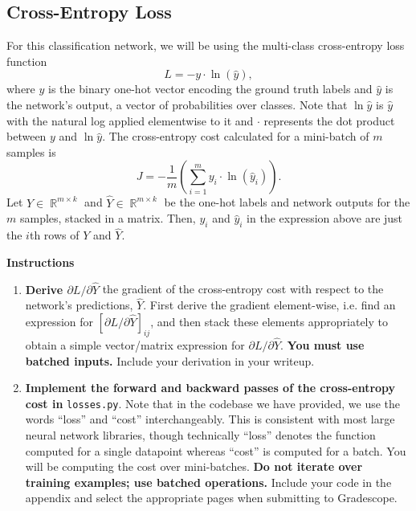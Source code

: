 \documentclass{article}
\DeclareMathOperator{\R}{\mathbb{R}}
\begin{document}
\newpage
\subsection{Cross-Entropy Loss}
For this classification network, we will be using the multi-class cross-entropy loss function
\[
    L = -y \cdot \ln{(\hat{y})},
\]
where $y$ is the binary one-hot vector encoding the ground truth labels and $\hat{y}$ is the network's output, a vector of probabilities over classes. 
Note that $\ln\hat{y}$ is $\hat{y}$ with the natural log applied elementwise to it and $\cdot$ represents the dot product between $y$ and $\ln\hat{y}$. 
The cross-entropy cost calculated for a mini-batch of $m$ samples is
\[
    J = -\frac{1}{m}\left(\sum_{i=1}^m y_i \cdot \ln{(\hat{y}_i)}\right).
\]
Let $Y \in \R^{m \times k}$ and $\hat{Y} \in \R^{m \times k}$ be the one-hot labels and network outputs for the $m$ samples, stacked in a matrix. 
Then, $y_i$ and $\hat{y}_i$ in the expression above are just the $i$th rows of $Y$ and $\hat{Y}$.

\textbf{Instructions}
\begin{enumerate}
    \item 
    \textbf{Derive $\partial L/\partial \hat{Y}$} the gradient of the cross-entropy cost with respect to the network's predictions, $\hat{Y}$. 
    First derive the gradient element-wise, i.e. find an expression for $[\partial L/\partial \hat{Y}]_{ij}$, and then stack these elements appropriately to obtain a simple vector/matrix expression for $\partial L/\partial \hat{Y}$. 
    \textbf{You must use batched inputs.} Include your derivation in your writeup.
    
    \item 
    \textbf{Implement the forward and backward passes of the cross-entropy cost in} \texttt{losses.py}. 
    Note that in the codebase we have provided, we use the words ``loss'' and ``cost'' interchangeably. 
    This is consistent with most large neural network libraries, though technically ``loss'' denotes the function computed for a single datapoint whereas ``cost'' is computed for a batch. 
    You will be computing the cost over mini-batches. 
    \textbf{Do not iterate over training examples; use batched operations.} 
    Include your code in the appendix and select the appropriate pages when submitting to Gradescope.
\end{enumerate}
\end{document}
